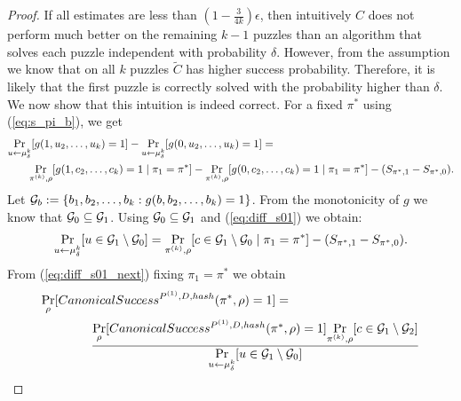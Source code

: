 \begin{proof}
If all estimates are less than $(1-\frac{3}{4k})\epsilon$, then intuitively $C$
does not perform much better on the remaining $k-1$ puzzles than an algorithm that solves each puzzle independent with probability $\delta$.
However, from the assumption we know that on all $k$ puzzles $\widetilde{C}$ has higher success probability.
Therefore, it is likely that the first puzzle is correctly solved with the probability higher than $\delta$.
%
We now show that this intuition is indeed correct. For a fixed $\pi^*$ using (\ref{eq:s_pi_b}), we get
\begin{align}
\label{eq:diff_s01}
  &\underset{u \leftarrow \mu_{\delta}^k}{\Pr}[g(1, u_2, \dots, u_k)=1] - \underset{u \leftarrow \mu_{\delta}^k}{\Pr}[g(0, u_2, \dots, u_k)=1] = \notag\\
&\mbox\qquad  \underset{\pi^{(k)}, \rho}{\Pr}[g(1, c_2, \dots, c_k) =1 \mid \pi_1 = \pi^*] - \underset{\pi^{(k)}, \rho}{\Pr}[g(0, c_2, \dots, c_k) = 1 \mid \pi_1 = \pi^*] - (S_{\pi^*,1} - S_{\pi^*,0}).
\end{align}
Let $\mathcal{G}_{b} := \{ b_1, b_2, \dots, b_k : g(b, b_2, \dots, b_k) = 1 \}$.
From the monotonicity of $g$ we know that $\mathcal{G}_0 \subseteq \mathcal{G}_1$.
Using $\mathcal{G}_0 \subseteq \mathcal{G}_1$ and (\ref{eq:diff_s01}) we obtain:
\begin{align}
  \label{eq:diff_s01_next}
  \underset{u \leftarrow \mu_{\delta}^k}{\Pr}[u \in \mathcal{G}_1 \setminus \mathcal{G}_0] = \underset{\pi^{(k)}, \rho}{\Pr}[c \in \mathcal{G}_1 \setminus \mathcal{G}_0 \mid \pi_1 = \pi^*] - (S_{\pi^*,1} - S_{\pi^*,0}).
\end{align}
From (\ref{eq:diff_s01_next}) fixing $\pi_1 = \pi^*$ we obtain
\begin{align}
\label{eq:pr_d_succ_0}
&\underset{\rho}{\Pr}[CanonicalSuccess^{P^{(1)}, D, hash}(\pi^*, \rho) = 1] = \notag\\
&\IndII\frac{\underset{\rho}{\Pr}[CanonicalSuccess^{P^{(1)}, D, hash}(\pi^*, \rho) = 1] \underset{\pi^{(k)}, \rho}{\Pr}[c \in \cG_1 \setminus \cG_2]}
{\underset{u \leftarrow \mu_{\delta}^k}{\Pr}[u \in \cG_1 \setminus \cG_0]} \notag\\

\end{align}
\end{proof}

